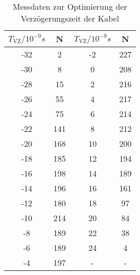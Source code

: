 \begin{table}[h!]
  \centering
  \caption{Messdaten zur Optimierung der Verzögerungszeit der Kabel}
  \label{tab:verzögerung}
  \begin{tabular}{c c c c}
    \toprule
      $T_{\text{VZ}}/10^{-9}s$ & N & $T_{\text{VZ}}/10^{-9}s$ & N \\
      \midrule
      -32   &   2    &    -2    &   227  \\
      -30   &   8    &    0     &   208  \\
      -28   &   15   &    2     &   216  \\
      -26   &   55   &    4     &   217  \\
      -24   &   75   &    6     &   214  \\
      -22   &   141  &    8     &   212  \\
      -20   &   168  &    10    &   200  \\
      -18   &   185  &    12    &   194  \\
      -16   &   198  &    14    &   189  \\
      -14   &   196  &    16    &   161  \\
      -12   &   180  &    18    &   97   \\
      -10   &   214  &    20    &   84   \\
      -8    &   189  &    22    &   38   \\
      -6    &   189  &    24    &   4    \\
      -4    &   197  &     -    &    -   \\
    \bottomrule
  \end{tabular}
\end{table}

%
